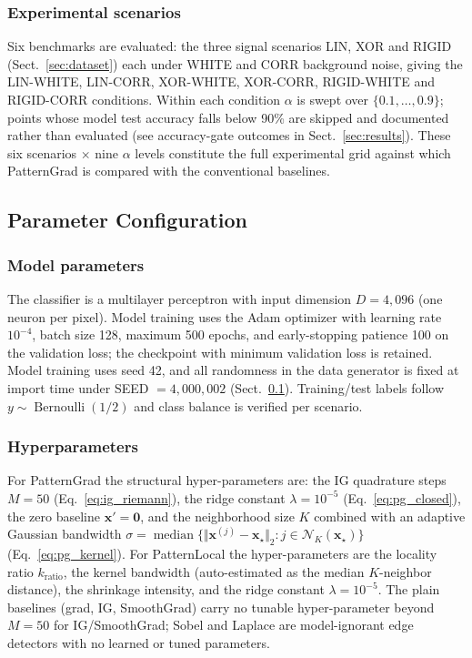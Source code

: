 \documentclass[pdflatex,sn-mathphys-num]{sn-jnl}
\theoremstyle{thmstyleone}
\theoremstyle{thmstyletwo}%
\theoremstyle{thmstylethree}%
\begin{document}
\subsubsection{Experimental scenarios}
Six benchmarks are evaluated: the three signal scenarios LIN, XOR and RIGID (Sect.~\ref{sec:dataset}) each under WHITE and CORR background noise, giving the LIN-WHITE, LIN-CORR, XOR-WHITE, XOR-CORR, RIGID-WHITE and RIGID-CORR conditions. Within each condition $\alpha$ is swept over $\{0.1,\dots,0.9\}$; points whose model test accuracy falls below 90\% are skipped and documented rather than evaluated (see accuracy-gate outcomes in Sect.~\ref{sec:results}). These six scenarios $\times$ nine $\alpha$ levels constitute the full experimental grid against which PatternGrad is compared with the conventional baselines.


\subsection{Parameter Configuration}\label{sec:param_config}

\subsubsection{Model parameters}
The classifier is a multilayer perceptron with input dimension $D=4{,}096$ (one neuron per pixel). Model training uses the Adam optimizer with learning rate $10^{-4}$, batch size 128, maximum 500 epochs, and early-stopping patience 100 on the validation loss; the checkpoint with minimum validation loss is retained. Model training uses seed 42, and all randomness in the data generator is fixed at import time under SEED $=4{,}000{,}002$ (Sect.~\ref{sec:param_config}). Training/test labels follow $y\sim\operatorname{Bernoulli}(1/2)$ and class balance is verified per scenario.

\subsubsection{Hyperparameters}
For PatternGrad the structural hyper-parameters are: the IG quadrature steps $M=50$ (Eq.~\eqref{eq:ig_riemann}), the ridge constant $\lambda=10^{-5}$ (Eq.~\eqref{eq:pg_closed}), the zero baseline $\mathbf{x}'=\mathbf{0}$, and the neighborhood size $K$ combined with an adaptive Gaussian bandwidth $\sigma=\operatorname{median}\{\Vert\mathbf{x}^{(j)}-\mathbf{x}_\star\Vert_2:j\in\mathcal{N}_K(\mathbf{x}_\star)\}$ (Eq.~\eqref{eq:pg_kernel}). For PatternLocal the hyper-parameters are the locality ratio $k_{\text{ratio}}$, the kernel bandwidth (auto-estimated as the median $K$-neighbor distance), the shrinkage intensity, and the ridge constant $\lambda=10^{-5}$. The plain baselines (grad, IG, SmoothGrad) carry no tunable hyper-parameter beyond $M=50$ for IG/SmoothGrad; Sobel and Laplace are model-ignorant edge detectors with no learned or tuned parameters.
\end{document}
